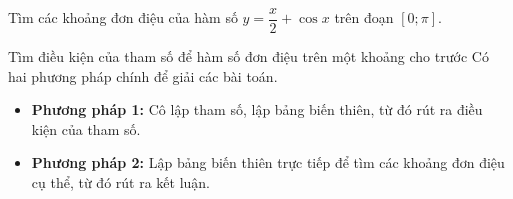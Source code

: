 \begin{bt}%
	Tìm các khoảng đơn điệu của hàm số $y=\dfrac{x}{2}+\cos x$ trên đoạn $[0;\pi]$.
\end{bt}
\begin{dang}{Tìm điều kiện của tham số để hàm số đơn điệu trên một khoảng cho trước}
	Có hai phương pháp chính để giải các bài toán.
	\begin{itemize}
		\item \textbf{Phương pháp 1:} Cô lập tham số, lập bảng biến thiên, từ đó rút ra điều kiện của tham số.
		
		\item \textbf{Phương pháp 2:} Lập bảng biến thiên trực tiếp để tìm các khoảng đơn điệu cụ thể, từ đó rút ra kết luận.
	\end{itemize}
\end{dang}
